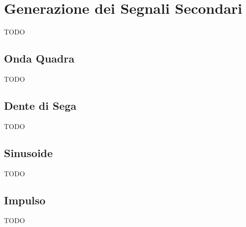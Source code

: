 \chapter{Generazione dei Segnali Secondari}\label{segnali_secondari}

TODO


\section{Onda Quadra}

TODO


\section{Dente di Sega}

TODO


\section{Sinusoide}

TODO


\section{Impulso}

TODO